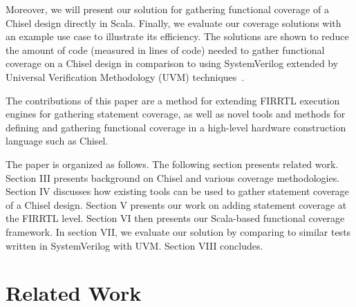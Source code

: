 \documentclass[conference]{IEEEtran}
\newcommand{\martin}[1]{{\color{blue} Martin: #1}}
\begin{document}
Moreover, we will present our solution for gathering functional coverage of a Chisel design directly in Scala. %
Finally, we evaluate our coverage solutions with an example use case to illustrate its efficiency. The solutions are shown to reduce the amount of code (measured in lines of code) needed to gather functional coverage on a Chisel design in comparison to using SystemVerilog extended by Universal Verification Methodology (UVM) techniques~\cite{uvm2015}.

The contributions of this paper are a method for extending FIRRTL execution engines for gathering statement coverage, 
as well as novel tools and methods for defining and gathering functional coverage in a high-level hardware construction language such as Chisel.

The paper is organized as follows.
The following section presents related work.
Section III presents background on Chisel and various coverage methodologies. 
Section IV discusses how existing tools can be used to gather statement coverage of a Chisel design.  
Section V presents our work on adding statement coverage at the FIRRTL level. 
Section VI then presents our Scala-based functional coverage framework.  
In section VII, we evaluate our solution by comparing to similar tests written in SystemVerilog with UVM. 
Section VIII concludes.

\section{Related Work}

\end{document}

